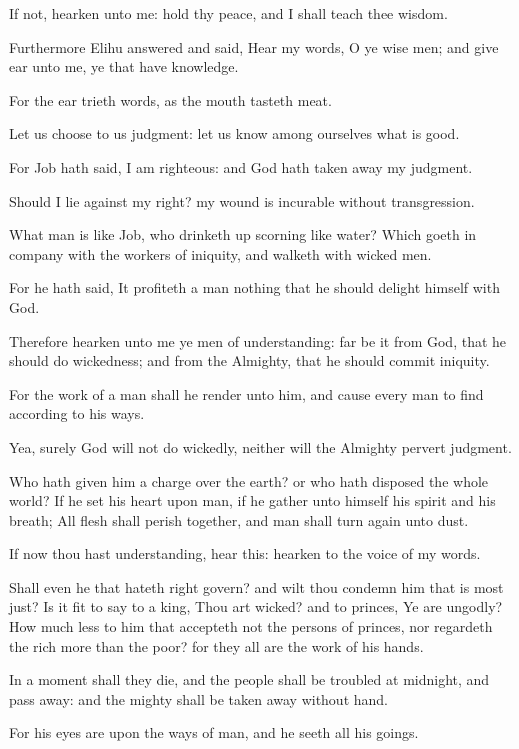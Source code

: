\Verse If not, hearken unto me: hold thy peace, and I shall teach thee wisdom.


\Chapter
\Verse Furthermore Elihu answered and said, \Verse Hear my words, O ye wise men; and give ear unto me, ye that have knowledge.

\Verse For the ear trieth words, as the mouth tasteth meat.

\Verse Let us choose to us judgment: let us know among ourselves what is good.

\Verse For Job hath said, I am righteous: and God hath taken away my judgment.

\Verse Should I lie against my right? my wound is incurable without transgression.

\Verse What man is like Job, who drinketh up scorning like water?  \Verse Which goeth in company with the workers of iniquity, and walketh with wicked men.

\Verse For he hath said, It profiteth a man nothing that he should delight himself with God.

\Verse Therefore hearken unto me ye men of understanding: far be it from God, that he should do wickedness; and from the Almighty, that he should commit iniquity.

\Verse For the work of a man shall he render unto him, and cause every man to find according to his ways.

\Verse Yea, surely God will not do wickedly, neither will the Almighty pervert judgment.

\Verse Who hath given him a charge over the earth? or who hath disposed the whole world?  \Verse If he set his heart upon man, if he gather unto himself his spirit and his breath; \Verse All flesh shall perish together, and man shall turn again unto dust.

\Verse If now thou hast understanding, hear this: hearken to the voice of my words.

\Verse Shall even he that hateth right govern? and wilt thou condemn him that is most just?  \Verse Is it fit to say to a king, Thou art wicked? and to princes, Ye are ungodly?  \Verse How much less to him that accepteth not the persons of princes, nor regardeth the rich more than the poor? for they all are the work of his hands.

\Verse In a moment shall they die, and the people shall be troubled at midnight, and pass away: and the mighty shall be taken away without hand.

\Verse For his eyes are upon the ways of man, and he seeth all his goings.

